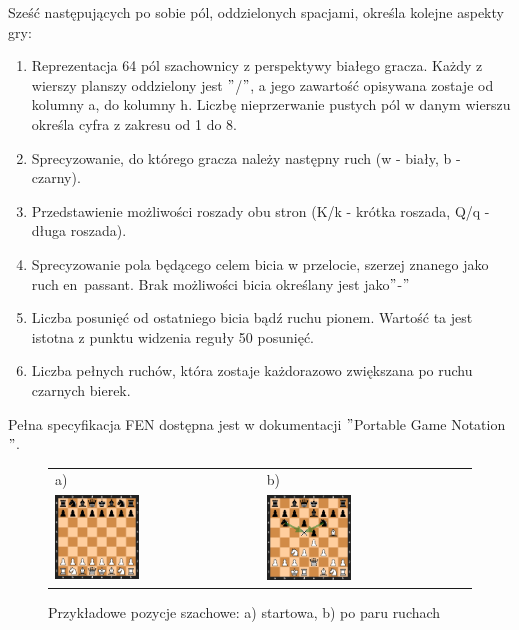 Sześć następujących po sobie pól, oddzielonych spacjami, określa kolejne aspekty gry:
\begin{enumerate}[itemsep=0.3em]
    \item Reprezentacja 64 pól szachownicy z perspektywy białego gracza.
    Każdy z wierszy planszy oddzielony jest \("\)/\("\), a jego zawartość opisywana zostaje od kolumny a, do kolumny h.
    Liczbę nieprzerwanie pustych pól w danym wierszu określa cyfra z zakresu od 1 do 8.
    \item Sprecyzowanie, do którego gracza należy następny ruch (w - biały, b - czarny).
    \item Przedstawienie możliwości roszady obu stron (K/k - krótka roszada, Q/q - długa roszada).
    \item Sprecyzowanie pola będącego celem bicia w przelocie, szerzej znanego jako ruch en~passant.
    Brak możliwości bicia określany jest jako\("\)-\("\)
    \item Liczba posunięć od ostatniego bicia bądź ruchu pionem.
    Wartość ta jest istotna z punktu widzenia reguły 50 posunięć.
    \item Liczba pełnych ruchów, która zostaje każdorazowo zwiększana po ruchu czarnych bierek.
\end{enumerate}

Pełna specyfikacja FEN dostępna jest w dokumentacji \("\)Portable Game Notation\("\). \cite*{PGNdoc}

\begin{figure}[ht]
    \centering
    \begin{tabular}{@{}ll@{}}
        a) & b) \\
        \includegraphics[width=0.425\textwidth]{rozdzialy/rozdzial01/1_komunikacja-z-systemem/rysunki/pozycja_startowa}
        &
        \includegraphics[width=0.425\textwidth]{rozdzialy/rozdzial01/1_komunikacja-z-systemem/rysunki/pozycja_niejasna}
    \end{tabular}
    \caption{Przykładowe pozycje szachowe: a) startowa, b) po paru ruchach}
    \label{fig: basic_chess_positions}
\end{figure}

